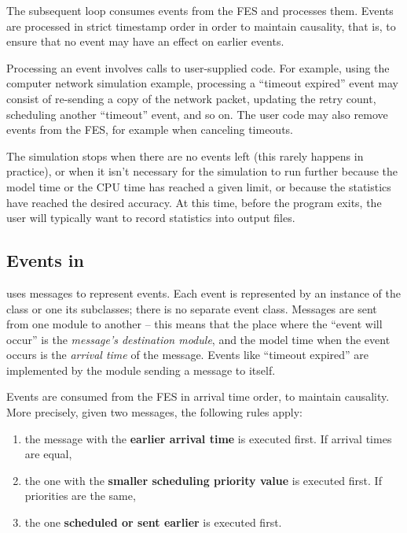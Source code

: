 The subsequent loop consumes events from the FES and processes
them. Events are processed in strict timestamp order in order
to maintain causality, that is, to ensure that no event may have
an effect on earlier events.

Processing an event involves calls to user-supplied code. For example,
using the computer network simulation example, processing a ``timeout
expired'' event may consist of re-sending a copy of the network
packet, updating the retry count, scheduling another ``timeout''
event, and so on. The user code may also remove events from the FES,
for example when canceling timeouts.

The simulation stops when there are no events left (this rarely happens
in practice), or when it isn't necessary for the simulation
to run further because the model time or the CPU time has reached
a given limit, or because the statistics have reached the desired
accuracy. At this time, before the program exits, the user
will typically want to record statistics into output files.


\subsection{Events in {\opp}}
\label{sec:simple-modules:events-in-opp}

{\opp} uses messages to represent
events. Each event is represented by an instance of the
 class or one its subclasses; there is no separate
event class. Messages are sent from one module to another -- this
means that the place where the ``event will occur'' is the
\textit{message's destination module}, and the model time when the
event occurs is the \textit{arrival time} of the
message. Events like ``timeout expired'' are implemented by the
module sending a message to itself.

Events are consumed from the FES in arrival time order, to
maintain causality. More precisely, given two messages, the following
rules apply:
\begin{enumerate}
\item{the message with the \textbf{earlier arrival time} is executed
    first.  If arrival times are equal,}
\item{the one with the \textbf{smaller scheduling priority value} is
    executed first. If priorities are the same,}
\item{the one \textbf{scheduled or sent earlier} is executed first.}
\end{enumerate}

